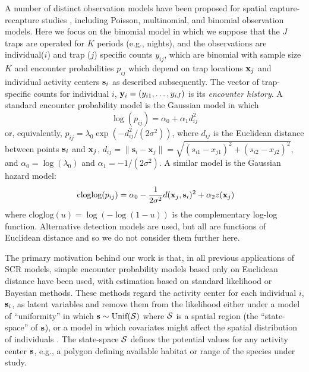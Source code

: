 \documentclass[12pt]{article}
\begin{document}
A number of distinct observation models have been proposed for spatial
capture-recapture studies \citep{borchers_efford:2008,
  royle_etal:2009ecol, efford_etal:2009ecol}, including Poisson,
multinomial, and binomial observation models.
Here we focus on the binomial model in which we suppose that the $J$
traps
are operated for $K$ periods (e.g., nights), and the observations are
individual($i$) and trap ($j$) specific counts $y_{ij}$, which are binomial with
sample size $K$ and encounter probabilities $p_{ij}$ which depend on
trap locations ${\bf x}_{j}$ and individual activity centers ${\bf
  s}_{i}$ as described subsequently.  The vector of trap-specific
counts for individual $i$, ${\bf y}_{i} = (y_{i1},\ldots,y_{iJ})$ is
its {\it encounter history}.  A standard encounter probability model
\citep{borchers_efford:2008} is the Gaussian model in which
\begin{equation}
\log(p_{ij})= \alpha_{0} + \alpha_{1} d_{ij}^{2}
\label{eq.encounter}
\end{equation}
or, equivalently,
$p_{ij} = \lambda_{0} \exp(-d_{ij}^{2} /(2\sigma^{2}) )$,
where %
$d_{ij}$ is the Euclidean
distance between points ${\bf s}_{i}$ and ${\bf x}_{j}$,
$d_{ij} = \|\textbf{s}_i - \textbf{x}_j\| = \sqrt{(s_{i1}-x_{j1})^2 +
  (s_{i2}-x_{j2})^2}$,
and
 $\alpha_{0} = \log(\lambda_{0})$ and $\alpha_{1} = -1/(2\sigma^2)$.
A similar model is the Gaussian hazard model:
\begin{equation}
\mbox{ cloglog}(p_{ij}) = \alpha_{0}  -\frac{1}{2\sigma^{2}}
d({\bf x}_{j},{\bf s}_{i})^{2} + \alpha_{2}  z({\bf x}_{j})
\label{eq.hazard}
\end{equation}
where $\mbox{cloglog}(u) = \log(-\log(1-u))$ is the complementary
log-log function.
Alternative detection models are used, but all are
functions of Euclidean distance and so we do not consider them
further here.

The primary motivation behind our work is that, in all previous
applications of SCR models, simple encounter probability models based
only on Euclidean distance have been used, with estimation based on
standard likelihood or Bayesian methods. These methods regard the
activity center for each individual $i$, ${\bf s}_{i}$, as latent
variables and remove them from the likelihood either under a model of
``uniformity'' in which ${\bf s} \sim \mbox{Unif}({\cal S})$ where
${\cal S}$ is a spatial region (the ``state-space'' of ${\bf s}$), or
a model in which covariates might affect the spatial distribution of
individuals \citep{borchers_efford:2008}. The state-space ${\cal S}$
defines the potential values for any activity center ${\bf s}$, e.g.,
a polygon defining available habitat or range of the species under
study.
\end{document}

